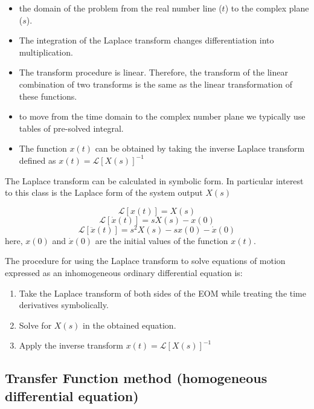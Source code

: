 \documentclass[12pt,a4paper]{article}
\newcommand{\Laplace}[1]{\ensuremath{\mathcal{L}{\left[#1\right]}}}
\begin{document}
		
		\begin{itemize}
			\item the domain of the problem from the real number line ($t$) to the complex plane ($s$).
			\item The integration of the Laplace transform changes differentiation into multiplication.
			\item The transform procedure is linear. Therefore, the transform of the linear combination of two transforms is the same as the linear transformation of these functions. 
			\item to move from the time domain to the complex number plane we typically use tables of pre-solved integral. 
			\item The function $x(t)$ can be obtained by taking the inverse Laplace transform defined as $x(t) = \Laplace{X(s)}^{-1}$
		\end{itemize}
		
		The Laplace transform can be calculated in symbolic form. In particular interest to this class is the Laplace form of the system output $X(s)$

		\begin{equation}
			\Laplace{x(t)} = X(s)
		\end{equation}		
		\begin{equation}
			\Laplace{\dot{x}(t)} = sX(s)-x(0)
		\end{equation}	
		\begin{equation}
			\Laplace{\ddot{x}(t)} = s^2X(s)-sx(0) - \dot{x}(0)
		\end{equation}	
		here, $x(0)$ and $\dot{x}(0)$ are the initial values of the function $x(t)$. 
		


The procedure for using the Laplace transform to solve equations of motion expressed as an inhomogeneous ordinary differential equation is:
\begin{enumerate}
	\item Take the Laplace transform of both sides of the EOM while treating the time derivatives symbolically.
	\item Solve for $X(s)$ in the obtained equation.
	\item Apply the inverse transform $x(t) = \Laplace{X(s)}^{-1}$
\end{enumerate}

\subsection*{Transfer Function method (homogeneous differential equation)}
\end{document}
